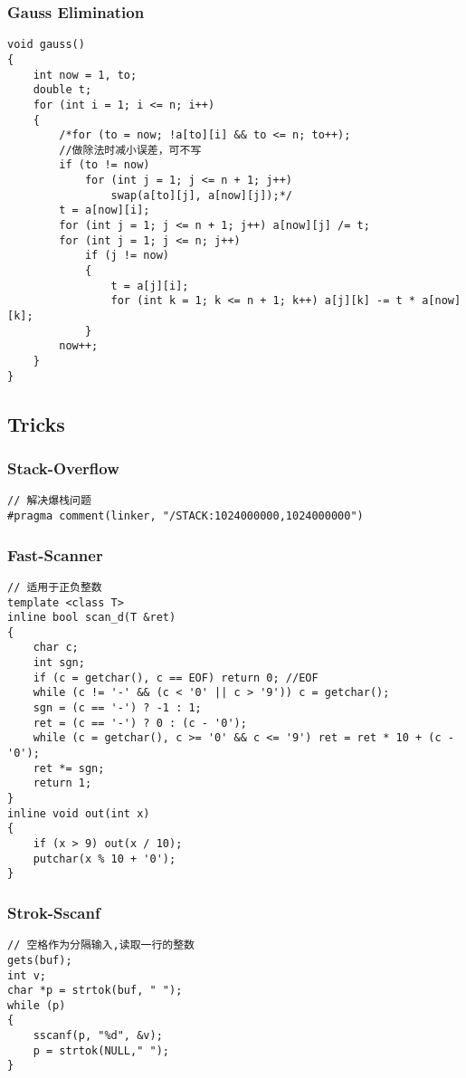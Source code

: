 \documentclass[twoside]{article}
\begin{document}
\subsubsection{Gauss Elimination}
\begin{lstlisting}
void gauss()
{
    int now = 1, to;
    double t;
    for (int i = 1; i <= n; i++)
    {
        /*for (to = now; !a[to][i] && to <= n; to++);
        //做除法时减小误差，可不写
        if (to != now)
            for (int j = 1; j <= n + 1; j++)
                swap(a[to][j], a[now][j]);*/
        t = a[now][i];
        for (int j = 1; j <= n + 1; j++) a[now][j] /= t;
        for (int j = 1; j <= n; j++)
            if (j != now)
            {
                t = a[j][i];
                for (int k = 1; k <= n + 1; k++) a[j][k] -= t * a[now][k];
            }
        now++;
    }
}
\end{lstlisting}
\subsection{Tricks}
\subsubsection{Stack-Overflow}
\begin{lstlisting}
// 解决爆栈问题
#pragma comment(linker, "/STACK:1024000000,1024000000")
\end{lstlisting}
\subsubsection{Fast-Scanner}
\begin{lstlisting}
// 适用于正负整数
template <class T>
inline bool scan_d(T &ret)
{
    char c;
    int sgn;
    if (c = getchar(), c == EOF) return 0; //EOF
    while (c != '-' && (c < '0' || c > '9')) c = getchar();
    sgn = (c == '-') ? -1 : 1;
    ret = (c == '-') ? 0 : (c - '0');
    while (c = getchar(), c >= '0' && c <= '9') ret = ret * 10 + (c - '0');
    ret *= sgn;
    return 1;
}
inline void out(int x)
{
    if (x > 9) out(x / 10);
    putchar(x % 10 + '0');
}
\end{lstlisting}
\subsubsection{Strok-Sscanf}
\begin{lstlisting}
// 空格作为分隔输入,读取一行的整数
gets(buf);
int v;
char *p = strtok(buf, " ");
while (p)
{
    sscanf(p, "%d", &v);
    p = strtok(NULL," ");
}
\end{lstlisting}
\end{document}
